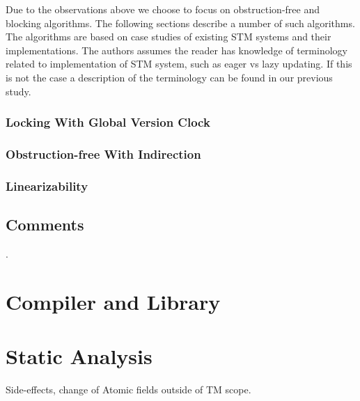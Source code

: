 Due to the observations above we choose to focus on obstruction-free and blocking algorithms. The following sections describe a number of such algorithms. The algorithms are based on case studies of existing \ac{STM} systems and their implementations. The authors assumes the reader has knowledge of terminology related to implementation of \ac{STM} system, such as eager vs lazy updating. If this is not the case a description of the terminology can be found in our previous study\cite[p. 53]{dpt907e14trending}.

\subsubsection{Locking With Global Version Clock}
\subsubsection{Obstruction-free With Indirection}
\subsubsection{Linearizability}

\subsection{Comments}
.
\section{Compiler and Library}
\section{Static Analysis}
Side-effects, change of Atomic fields outside of TM scope.

\worksheetend